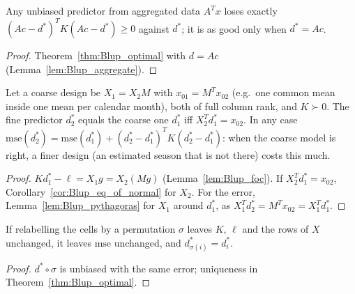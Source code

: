 \begin{theorem}\label{thm:Blup_aggregate}
  \leanok
  Any unbiased predictor from aggregated data $A^Tx$ loses exactly
  $(Ac - d^*)^TK(Ac - d^*) \ge 0$ against $d^*$; it is as good only when $d^* = Ac$.
\end{theorem}
\begin{proof}
  \leanok
  Theorem~\ref{thm:Blup_optimal} with $d = Ac$ (Lemma~\ref{lem:Blup_aggregate}).
\end{proof}

\begin{theorem}\label{thm:Blup_nested}
  \leanok
  Let a coarse design be $X_1 = X_2M$ with $x_{01} = M^Tx_{02}$ (e.g.\ one common mean inside
  one mean per calendar month), both of full column rank, and $K \succ 0$. The fine predictor
  $d_2^*$ equals the coarse one $d_1^*$ iff $X_2^Td_1^* = x_{02}$. In any case
  $\mathrm{mse}(d_2^*) = \mathrm{mse}(d_1^*) + (d_2^* - d_1^*)^TK(d_2^* - d_1^*)$: when the
  coarse model is right, a finer design (an estimated season that is not there) costs this much.
\end{theorem}
\begin{proof}
  \leanok
  $Kd_1^* - \ell = X_1g = X_2(Mg)$ (Lemma~\ref{lem:Blup_foc}). If $X_2^Td_1^* = x_{02}$,
  Corollary~\ref{cor:Blup_eq_of_normal} for $X_2$. For the error,
  Lemma~\ref{lem:Blup_pythagoras} for $X_1$ around $d_1^*$, as
  $X_1^Td_2^* = M^Tx_{02} = X_1^Td_1^*$.
\end{proof}

\begin{lemma}\label{lem:Blup_symmetry}
  \leanok
  If relabelling the cells by a permutation $\sigma$ leaves $K$, $\ell$ and the rows of $X$
  unchanged, it leaves $\mathrm{mse}$ unchanged, and $d^*_{\sigma(i)} = d^*_i$.
\end{lemma}
\begin{proof}
  \leanok
  $d^*\circ\sigma$ is unbiased with the same error; uniqueness in
  Theorem~\ref{thm:Blup_optimal}.
\end{proof}

